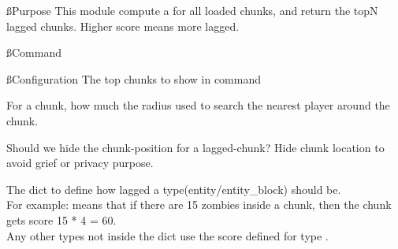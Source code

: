 \ss{Purpose}
This module compute a  for all loaded chunks, and return the topN lagged chunks.
Higher score means more lagged.

\ss{Command}

\ss{Configuration}
The top chunks to show in  command

For a chunk, how much the radius used to search the nearest player around the chunk.

Should we hide the chunk-position for a lagged-chunk?
Hide chunk location to avoid grief or privacy purpose.

The dict to define how lagged a type(entity/entity\_block) should be.\\
For example:   means that if there are 15 zombies inside a chunk,
then the chunk gets score 15 * 4 = 60.\\
Any other types not inside the dict use the score defined for type .